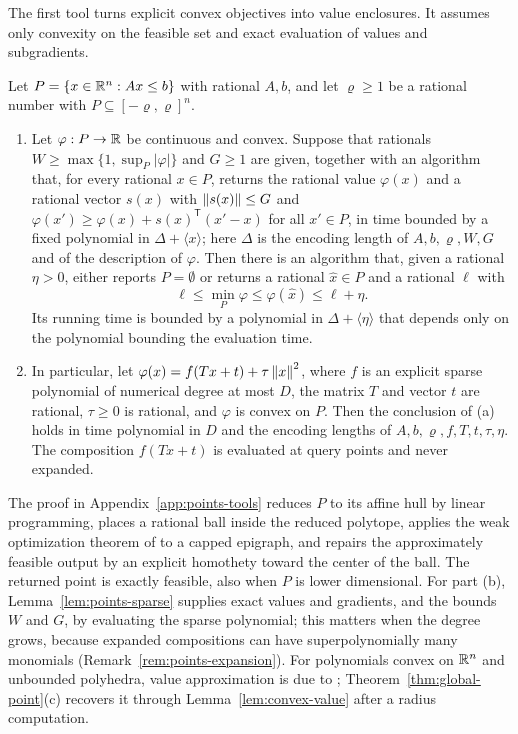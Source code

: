 The first tool turns explicit convex objectives into value enclosures. It
assumes only convexity on the feasible set and exact evaluation of values
and subgradients.

\begin{lemma}\label{lem:convex-value}
Let $P=\{x\in\mathbb R^n:Ax\le b\}$ with rational $A,b$, and let $\varrho\ge1$ be a
rational number with $P\subseteq[-\varrho,\varrho]^n$.
\begin{enumerate}[label=(\alph*)]
\item Let $\varphi:P\to\mathbb R$ be continuous and convex. Suppose that rationals
$W\ge\max\{1,\sup_P|\varphi|\}$ and $G\ge1$ are given, together with an
algorithm that, for every rational $x\in P$, returns the rational value
$\varphi(x)$ and a rational vector $s(x)$ with $\left\lVert s(x)\right\rVert\le G$ and
$\varphi(x')\ge\varphi(x)+s(x)^{\mathsf T}(x'-x)$ for all $x'\in P$, in time
bounded by a fixed polynomial in $\Delta+\langle x\rangle$; here $\Delta$ is
the encoding length of $A,b,\varrho,W,G$ and of the description of
$\varphi$. Then there is an algorithm that, given a rational $\eta>0$,
either reports $P=\emptyset$ or returns a rational $\hat x\in P$ and a
rational $\ell$ with
\[
 \ell\le\min_P\varphi\le\varphi(\hat x)\le\ell+\eta .
\]
Its running time is bounded by a polynomial in $\Delta+\langle\eta\rangle$
that depends only on the polynomial bounding the evaluation time.
\item In particular, let $\varphi(x)=f(Tx+t)+\tau\left\lVert x\right\rVert^2$, where $f$ is an
explicit sparse polynomial of numerical degree at most $D$, the matrix $T$
and vector $t$ are rational, $\tau\ge0$ is rational, and $\varphi$ is convex
on $P$. Then the conclusion of (a) holds in time polynomial in $D$ and the
encoding lengths of $A,b,\varrho,f,T,t,\tau,\eta$. The composition
$f(Tx+t)$ is evaluated at query points and never expanded.
\end{enumerate}
\end{lemma}

The proof in Appendix~\ref{app:points-tools} reduces $P$ to its affine hull
by linear programming, places a rational ball inside the reduced polytope,
applies the weak optimization theorem of
\citet[Corollary~(4.2.7)]{GroetschelLovaszSchrijver1988} to a capped
epigraph, and repairs the approximately feasible output by an explicit
homothety toward the center of the ball. The returned point is exactly
feasible, also when $P$ is lower dimensional. For part (b),
Lemma~\ref{lem:points-sparse} supplies exact values and gradients, and the
bounds $W$ and $G$, by evaluating the sparse polynomial; this matters when
the degree grows, because expanded compositions can have superpolynomially
many monomials (Remark~\ref{rem:points-expansion}). For polynomials convex
on $\mathbb R^n$ and unbounded polyhedra, value approximation is due to
\citet{SlotSteurerWiedmer2025}; Theorem~\ref{thm:global-point}(c) recovers
it through Lemma~\ref{lem:convex-value} after a radius computation.

